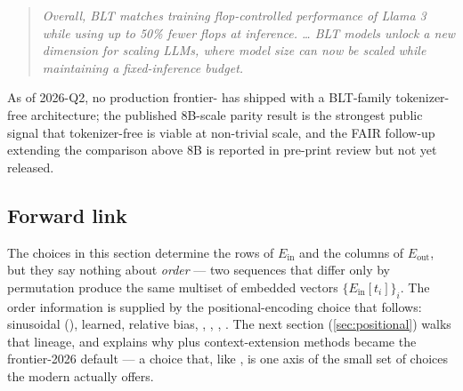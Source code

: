 \begin{quote}
\itshape Overall, BLT matches training flop-controlled performance of
Llama 3 while using up to 50\% fewer flops at inference. … BLT models
unlock a new dimension for scaling LLMs, where model size can now be
scaled while maintaining a fixed-inference budget.
\end{quote}

\begin{forumsignal}
As of 2026-Q2, no production frontier- has shipped with a
BLT-family tokenizer-free architecture; the published 8B-scale parity
result \citep{blt2024} is the strongest public signal that
tokenizer-free is viable at non-trivial scale, and the FAIR follow-up
extending the comparison above 8B is reported in pre-print review but
not yet released. 
\end{forumsignal}

\subsection{Forward link}

The choices in this section determine the rows of $E_{\text{in}}$ and
the columns of $E_{\text{out}}$, but they say nothing about \emph{order}
— two sequences that differ only by permutation produce the same
multiset of embedded vectors $\{E_{\text{in}}[t_i]\}_i$. The order
information is supplied by the positional-encoding choice that
follows: sinusoidal (\citealp[\S 3.5]{vaswani2017}), learned, 
relative bias, , , , . The next section
(\cref{sec:positional}) walks that lineage, and explains why  plus
context-extension methods became the frontier-2026 default — a
choice that, like , is one axis of the small set of
choices the modern  actually offers.
